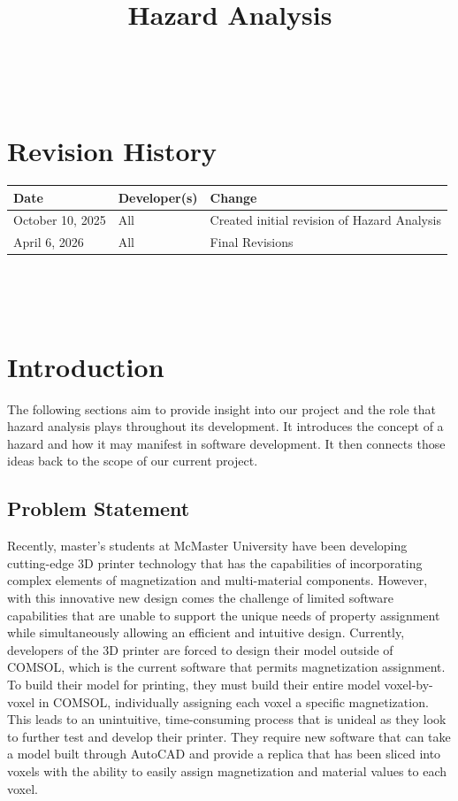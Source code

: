 \documentclass{article}
\title{Hazard Analysis\\\progname}
\author{\authname}
\date{}
\begin{document}
\maketitle
\thispagestyle{empty}

~\newpage


\section{Revision History}

\begin{tabularx}{\textwidth}{llX}
\toprule
\textbf{Date} & \textbf{Developer(s)} & \textbf{Change}\\
\midrule
October 10, 2025 & All & Created initial revision of Hazard Analysis\\
April 6, 2026 & All & Final Revisions\\
\bottomrule
\end{tabularx}

~\newpage

\tableofcontents

\listoftables

~\newpage


\section{Introduction}

The following sections aim to provide insight into our project and the role that hazard analysis
plays throughout its development. It introduces the concept of a hazard and how it may manifest
in software development. It then connects those ideas back to the scope of our current project.

\subsection{Problem Statement}

Recently, master's students at McMaster University have been developing cutting-edge 3D
printer technology that has the capabilities of incorporating complex elements of
magnetization and multi-material components. However, with this innovative new design
comes the challenge of limited software capabilities that are unable to support the
unique needs of property assignment while simultaneously allowing an efficient and
intuitive design. Currently, developers of the 3D printer are forced to design their
model outside of COMSOL, which is the current software that permits magnetization assignment.
To build their model for printing, they must build their entire model voxel-by-voxel in
COMSOL, individually assigning each voxel a specific magnetization. This leads to an
unintuitive, time-consuming process that is unideal as they look to further test and develop
their printer. They require new software that can take a model built through AutoCAD and
provide a replica that has been sliced into voxels with the ability to easily assign
magnetization and material values to each voxel.
\end{document}
